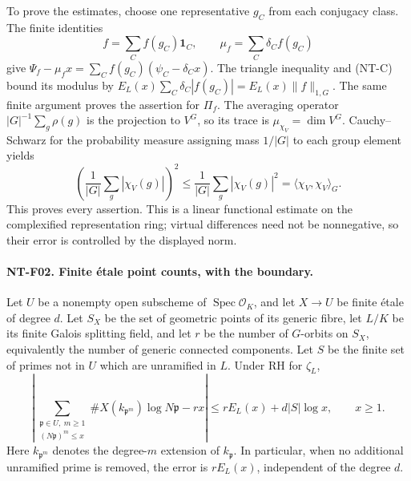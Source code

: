 To prove the estimates, choose one representative $g_C$ from each
conjugacy class.  The finite identities
\[
 f=\sum_C f(g_C)\mathbf1_C,
 \qquad \mu_f=\sum_C\delta_Cf(g_C)
\]
give $\Psi_f-\mu_fx=\sum_Cf(g_C)(\psi_C-\delta_Cx)$.
The triangle inequality and (NT-C) bound its modulus by
$E_L(x)\sum_C\delta_C|f(g_C)|=E_L(x)\|f\|_{1,G}$.
The same finite argument proves the assertion for $\Pi_f$.
The averaging operator $|G|^{-1}\sum_g\rho(g)$ is the projection to $V^G$,
so its trace is $\mu_{\chi_V}=\dim V^G$.  Cauchy--Schwarz for the
probability measure assigning mass $1/|G|$ to each group element yields
\[
 \left(\frac1{|G|}\sum_g|\chi_V(g)|\right)^2
 \le\frac1{|G|}\sum_g|\chi_V(g)|^2
 =\langle\chi_V,\chi_V\rangle_G.
\]
This proves every assertion.  This is a linear functional estimate on the
complexified representation ring; virtual differences need not be
nonnegative, so their error is controlled by the displayed norm.

\paragraph{NT-F02. Finite \texorpdfstring{\'{e}}{e}tale point counts, with the boundary.}
Let $U$ be a nonempty open subscheme of
$\operatorname{Spec}\mathcal O_K$, and let $X\to U$ be finite \'{e}tale
of degree $d$.  Let $S_X$ be the set of geometric points of its generic
fibre, let $L/K$ be its finite Galois splitting field, and let $r$ be the
number of $G$-orbits on $S_X$, equivalently the number of generic connected
components.  Let $S$ be the finite set of primes not in $U$ which are
unramified in $L$.  Under RH for $\zeta_L$,
\[
 \left|\sum_{\substack{\mathfrak p\in U,\ m\ge1\\(N\mathfrak p)^m\le x}}
       \#X(k_{\mathfrak p^m})\log N\mathfrak p-rx\right|
 \le rE_L(x)+d|S|\log x,\qquad x\ge1.
\tag{NT-F02}
\]
Here $k_{\mathfrak p^m}$ denotes the degree-$m$ extension of
$k_{\mathfrak p}$.  In particular, when no additional unramified prime is
removed, the error is $rE_L(x)$, independent of the degree $d$.

